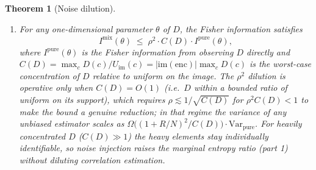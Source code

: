 \documentclass[11pt]{article}
\theoremstyle{definition}
\theoremstyle{plain}
\newtheorem{theorem}{Theorem}[section]
\theoremstyle{remark}
\newcommand{\enc}{\mathrm{enc}}
\begin{document}
\begin{theorem}[Noise dilution]
\begin{enumerate}
\item For any one-dimensional parameter $\theta$ of $D$, the
  Fisher information satisfies
  \begin{equation}
  \label{eq:fisher-noise}
  I^{\mathrm{mix}}(\theta) \;\leq\; \rho^2 \cdot C(D) \cdot I^{\mathrm{pure}}(\theta),
  \end{equation}
  where $I^{\mathrm{pure}}(\theta)$ is the Fisher information from
  observing $D$ directly and
  $C(D) = \max_c D(c) / U_{\mathrm{im}}(c) = |\mathrm{im}(\enc)| \max_c D(c)$
  is the worst-case concentration of $D$ relative to uniform on the
  image.  The $\rho^2$ dilution is operative only when $C(D) = O(1)$
  (i.e.\ $D$ within a bounded ratio of uniform on its support), which
  requires $\rho \lesssim 1/\sqrt{C(D)}$ for $\rho^2 C(D) < 1$ to make
  the bound a genuine reduction; in that regime the variance of any
  unbiased estimator scales as
  $\Omega\!\bigl((1 + R/N)^2 / C(D)\bigr) \cdot \mathrm{Var}_{\mathrm{pure}}$.
  For heavily concentrated $D$ ($C(D) \gg 1$) the heavy elements stay
  individually identifiable, so noise injection raises the marginal
  entropy ratio (part 1) without diluting correlation estimation.
\end{enumerate}
\end{theorem}
\end{document}
